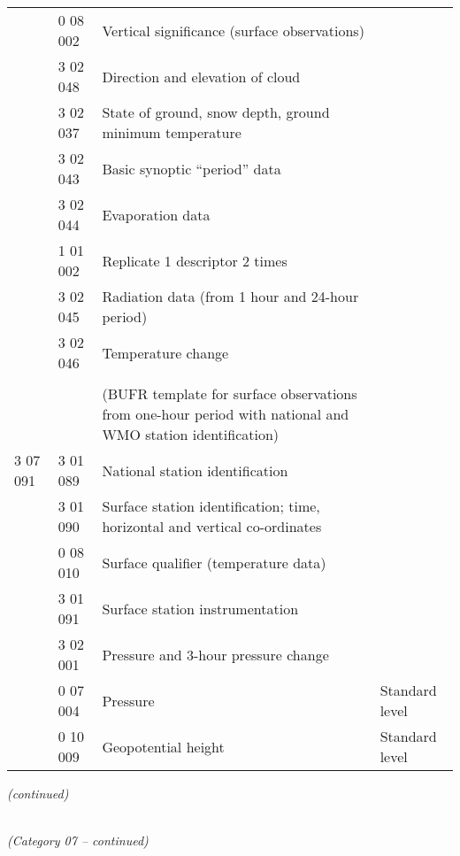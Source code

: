 \begin{longtable}[]{@{}llll@{}}
& 0 08 002 & Vertical significance (surface observations) &\tabularnewline
& 3 02 048 & Direction and elevation of cloud &\tabularnewline
& 3 02 037 & State of ground, snow depth, ground minimum temperature &\tabularnewline
& 3 02 043 & Basic synoptic ``period'' data &\tabularnewline
& 3 02 044 & Evaporation data &\tabularnewline
& 1 01 002 & Replicate 1 descriptor 2 times &\tabularnewline
& 3 02 045 & Radiation data (from 1 hour and 24-hour period) &\tabularnewline
& 3 02 046 & Temperature change &\tabularnewline
& & &\tabularnewline
& & (BUFR template for surface observations from one-hour period with national and WMO station identification) &\tabularnewline
3 07 091 & 3 01 089 & National station identification &\tabularnewline
& 3 01 090 & Surface station identification; time, horizontal and vertical co-ordinates &\tabularnewline
& 0 08 010 & Surface qualifier (temperature data) &\tabularnewline
& 3 01 091 & Surface station instrumentation &\tabularnewline
& 3 02 001 & Pressure and 3-hour pressure change &\tabularnewline
& 0 07 004 & Pressure & Standard level\tabularnewline
& 0 10 009 & Geopotential height & Standard level\tabularnewline
\bottomrule
\end{longtable}

\emph{(continued)}

\emph{\\
(Category 07 -- continued)}

